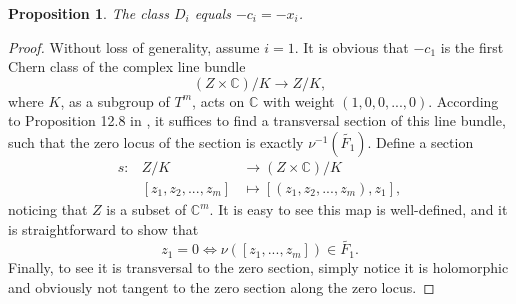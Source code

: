 \documentclass[12pt]{amsart}
\newtheorem{proposition}[theorem]{Proposition}
\theoremstyle{definition}
\numberwithin{equation}{section}
\begin{document}
\begin{proposition}\label{prop:Poincare dual}
The class $D_{i}$ equals $-c_{i}=-x_{i}$.
\end{proposition}
\begin{proof}
Without loss of generality, assume $i=1$. It is obvious that
$-c_{1}$ is the first Chern class of the complex line bundle
\begin{equation}
(Z\times {{\mathbb{C}}})/K\rightarrow Z/K,
\end{equation}
where $K$, as a subgroup of $T^m$, acts on ${{\mathbb{C}}}$ with weight
$(1,0,0,...,0)$. According to Proposition 12.8 in \cite{BT:book}, it
suffices to find a transversal section of this line bundle, such
that the zero locus of the section is exactly
$\nu^{-1}(\tilde{F_{1}})$. Define a section
\begin{eqnarray*}
s: &Z/K & \rightarrow (Z\times {{\mathbb{C}}})/K\\
&   [z_{1},z_{2},...,z_{m}]&\mapsto [(z_{1},z_{2},...,z_{m}),z_{1}],
\end{eqnarray*}
noticing that $Z$ is a subset of ${{\mathbb{C}}}^m$. It is easy to see this map
is well-defined, and it is straightforward to show that
\begin{equation}
z_{1}=0 \Leftrightarrow \nu([z_{1},...,z_{m}])\in \tilde{F_{1}}.
\end{equation}
Finally, to see it is transversal to the zero section, simply notice
it is holomorphic and obviously not tangent to the zero section
along the zero locus.
\end{proof}
\end{document}
